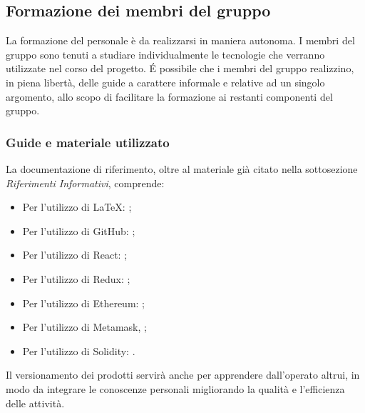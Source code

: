 \documentclass[NormeDiProgetto.tex]{subfiles}
\begin{document}
	\subsection{Formazione dei membri del gruppo}
		La formazione del personale è da realizzarsi in maniera autonoma. I membri del gruppo \gruppo sono tenuti a studiare individualmente le tecnologie che verranno utilizzate nel corso del progetto. \'{E} possibile che i membri del gruppo realizzino, in piena libertà, delle guide a carattere informale e relative ad un singolo argomento, allo scopo di facilitare la formazione ai restanti componenti del gruppo.

	\subsubsection{Guide e materiale utilizzato}
	 La documentazione di riferimento, oltre al materiale già citato nella sottosezione \emph{Riferimenti Informativi}, comprende:\\
	\begin{itemize}
		\item Per l'utilizzo di \LaTeX: ;\\
		\item Per l'utilizzo di GitHub: ;\\
		\item Per l'utilizzo di React: ;\\
		\item Per l'utilizzo di Redux: ;\\
		\item Per l'utilizzo di Ethereum: ;\\
		\item Per l'utilizzo di Metamask, ;\\ 
		\item Per l'utilizzo di Solidity: .\\
	\end{itemize}
	Il versionamento dei prodotti servirà anche per apprendere dall'operato
	altrui, in modo da integrare le conoscenze personali migliorando la qualità e
	l'efficienza delle attività.
	
\end{document}
